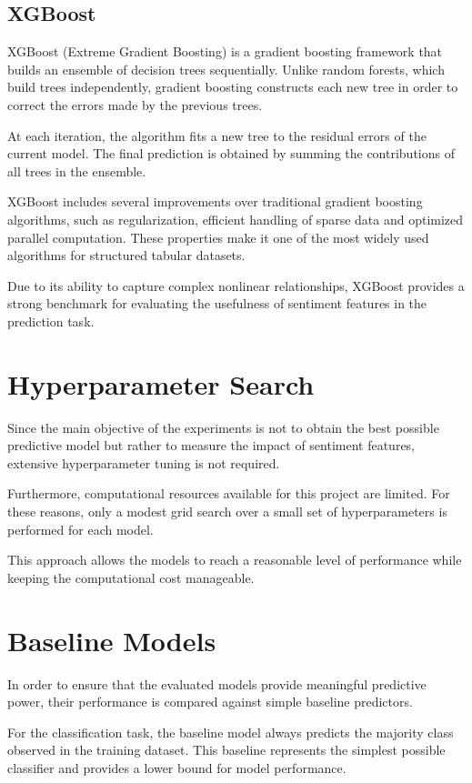 \subsection{XGBoost}

XGBoost (Extreme Gradient Boosting) is a gradient boosting framework that builds an ensemble of decision trees sequentially. Unlike random forests, which build trees independently, gradient boosting constructs each new tree in order to correct the errors made by the previous trees.

At each iteration, the algorithm fits a new tree to the residual errors of the current model. The final prediction is obtained by summing the contributions of all trees in the ensemble.

XGBoost includes several improvements over traditional gradient boosting algorithms, such as regularization, efficient handling of sparse data and optimized parallel computation. These properties make it one of the most widely used algorithms for structured tabular datasets.

Due to its ability to capture complex nonlinear relationships, XGBoost provides a strong benchmark for evaluating the usefulness of sentiment features in the prediction task.

\section{Hyperparameter Search}

Since the main objective of the experiments is not to obtain the best possible predictive model but rather to measure the impact of sentiment features, extensive hyperparameter tuning is not required.

Furthermore, computational resources available for this project are limited. For these reasons, only a modest grid search over a small set of hyperparameters is performed for each model.

This approach allows the models to reach a reasonable level of performance while keeping the computational cost manageable.

\section{Baseline Models}

In order to ensure that the evaluated models provide meaningful predictive power, their performance is compared against simple baseline predictors.

For the classification task, the baseline model always predicts the majority class observed in the training dataset. This baseline represents the simplest possible classifier and provides a lower bound for model performance.


